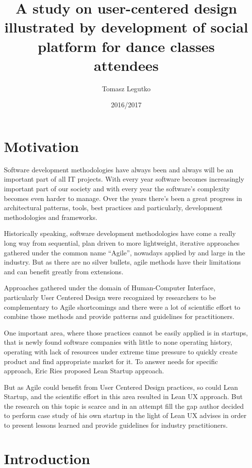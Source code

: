 \documentclass{article}
\title{A study on user-centered design illustrated by development of social platform for dance classes attendees}
\author{Tomasz Legutko}
\date{2016/2017}
\begin{document}
\maketitle
\tableofcontents
\section{Motivation}
Software development methodologies have always been and always will be an important part of all IT projects. With every year software becomes increasingly important part of our society and with every year the software's complexity becomes even harder to manage. Over the years there's been a great progress in architectural patterns, tools, best practices and particularly, development methodologies and frameworks.

Historically speaking, software development methodologies have come a really long way from sequential, plan driven to more lightweight, iterative approaches gathered under the common name ``Agile'', nowadays applied by and large in the industry. But as there are no silver bullets, agile methods have their limitations and can benefit greatly from extensions.

Approaches gathered under the domain of Human-Computer Interface, particularly User Centered Design were recognized by researchers to be complementary to Agile shortcomings and there were a lot of scientific effort to combine those methods and provide patterns and guidelines for practitioners. 

One important area, where those practices cannot be easily applied is in startups, that is newly found software companies with little to none operating history, operating with lack of resources under extreme time pressure to quickly create product and find appropriate market for it. To answer needs for specific approach, Eric Ries proposed Lean Startup approach.

But as Agile could benefit from User Centered Design practices, so could Lean Startup, and the scientific effort in this area resulted in Lean UX approach. But the research on this topic is scarce and in an attempt fill the gap author decided to perform case study of his own startup in the light of Lean UX advises in order to present lessons learned and provide guidelines for industry practitioners.

\section{Introduction}
\end{document}
